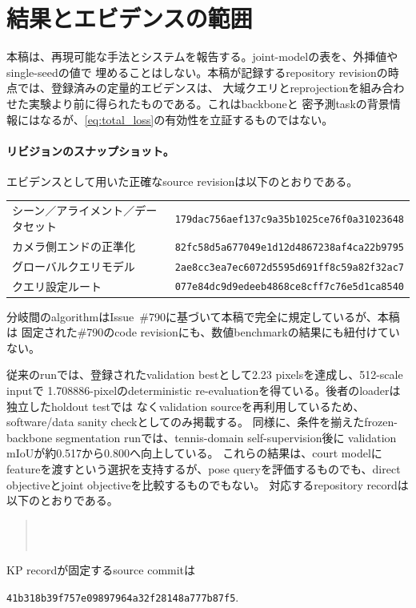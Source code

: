 \section{結果とエビデンスの範囲}
\label{sec:results}

本稿は、再現可能な手法とシステムを報告する。joint-modelの表を、外挿値やsingle-seedの値で
埋めることはしない。本稿が記録するrepository revisionの時点では、登録済みの定量的エビデンスは、
大域クエリとreprojectionを組み合わせた実験より前に得られたものである。これはbackboneと
密予測taskの背景情報にはなるが、\cref{eq:total_loss}の有効性を立証するものではない。

\paragraph{リビジョンのスナップショット。}
エビデンスとして用いた正確なsource revisionは以下のとおりである。
\begin{center}
\small
\begin{tabular}{@{}ll@{}}
シーン／アライメント／データセット & \texttt{179dac756aef137c9a35b1025ce76f0a31023648} \\
カメラ側エンドの正準化 & \texttt{82fc58d5a677049e1d12d4867238af4ca22b9795} \\
グローバルクエリモデル & \texttt{2ae8cc3ea7ec6072d5595d691ff8c59a82f32ac7} \\
クエリ設定ルート & \texttt{077e84dc9d9edeeb4868ce8cff7c76e5d1ca8540} \\
\end{tabular}
\end{center}
分岐間のalgorithmはIssue~\#790に基づいて本稿で完全に規定しているが、本稿は
固定された\#790のcode revisionにも、数値benchmarkの結果にも紐付けていない。



従来の\KP runでは、登録されたvalidation bestとして2.23 pixelsを達成し、512-scale inputで
1.708886-pixelのdeterministic re-evaluationを得ている。後者のloaderは独立したholdout testでは
なくvalidation sourceを再利用しているため、software/data sanity checkとしてのみ掲載する。
同様に、条件を揃えたfrozen-backbone segmentation runでは、tennis-domain self-supervision後に
validation mIoUが約0.517から0.800へ向上している。
これらの結果は、court modelに\DINO{} featureを渡すという選択を支持するが、pose queryを評価するものでも、direct objectiveとjoint objectiveを比較するものでもない。
対応するrepository recordは以下のとおりである。
\begin{quote}\small
{}\\
\\
\end{quote}
KP recordが固定するsource commitは
\begin{center}\texttt{41b318b39f757e09897964a32f28148a777b87f5}.\end{center}

